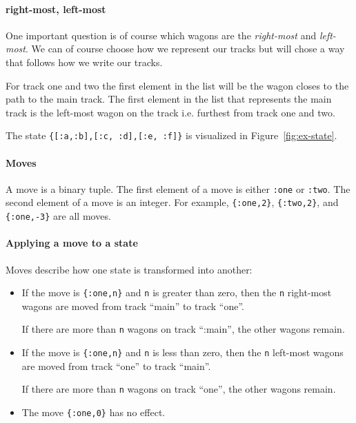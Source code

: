 \documentclass[a4paper,11pt]{article}
\begin{document}
\paragraph{right-most, left-most}

One important question is of course which wagons are the {\em
 right-most} and {\em left-most}. We can of course choose how we
represent our tracks but will chose a way that follows how we write our tracks.

For track one and two the first element in the list will be the wagon
closes to the path to the main track. The first element in the list
that represents the main track is the left-most wagon on the track
i.e. furthest from track one and two.

The state \verb+{[:a,:b],[:c, :d],[:e, :f]}+
is visualized in Figure~\ref{fig:ex-state}.


\paragraph{Moves}

A move is a binary tuple. The first element of a move is either
\verb+:one+ or \verb+:two+. The second element of a move is an
integer. For example, \verb+{:one,2}+, \verb+{:two,2}+, and
\verb+{:one,-3}+ are all moves.

\paragraph{Applying a move to a state}

Moves describe how one state is transformed into another:
\begin{itemize}
\item If the move is \verb+{:one,n}+ and \verb+n+ is greater than
  zero, then the \verb+n+ right-most wagons are moved from track
  ``main'' to track ``one''.

  If there are more than \verb+n+ wagons on track ``:main'', the
  other wagons remain.

\item If the move is \verb+{:one,n}+ and \verb+n+ is less than zero,
  then the \verb+n+ left-most wagons are moved from track ``one''
  to track ``main''.

  If there are more than \verb+n+ wagons on track ``one'', the
  other wagons remain.
\item The move \verb+{:one,0}+ has no effect.
\end{itemize}
\end{document}
